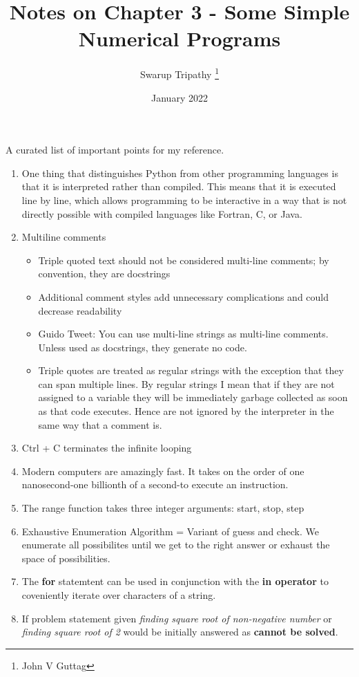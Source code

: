 \documentclass[11pt]{article}
\title{Notes on Chapter 3 - Some Simple Numerical Programs}
\author{Swarup Tripathy \thanks{John V Guttag}}
\date{January 2022}
\begin{document}
    \maketitle
    A curated list of important points for my reference.
    \begin{enumerate}
        \item One thing that distinguishes Python from other programming languages is that it is interpreted rather than compiled. This means that it is executed line by line, which allows programming to be interactive in a way that is not directly possible with compiled languages like Fortran, C, or Java.
        \item Multiline comments
            \begin{itemize}
                \item Triple quoted text should not be considered multi-line comments; by convention, they are docstrings
                \item Additional comment styles add unnecessary complications and could decrease readability
                \item Guido Tweet: You can use multi-line strings as multi-line comments. Unless used as docstrings, they generate no code.
                \item Triple quotes are treated as regular strings with the exception that they can span multiple lines. 
                By regular strings I mean that if they are not assigned to a variable they will be immediately garbage collected as soon as that code executes. 
                Hence are not ignored by the interpreter in the same way that a comment is.
            \end{itemize}
        \item Ctrl + C terminates the infinite looping 
        \item Modern computers are amazingly fast. It takes on the order of one nanosecond-one billionth of a second-to execute an instruction.
        \item The range function takes three integer arguments: start, stop, step
        \item Exhaustive Enumeration Algorithm = Variant of guess and check. We enumerate all possibilites until we get to the right answer or exhaust the space of possibilities.
        \item The \textbf{for} statemtent can be used in conjunction with the \textbf{in operator} to coveniently iterate over characters of a string.
        \item If problem statement given \textit{finding square root of non-negative number} or \textit{finding square root of 2} would be initially answered as \textbf{cannot be solved}. 

\end{enumerate}
\end{document}
